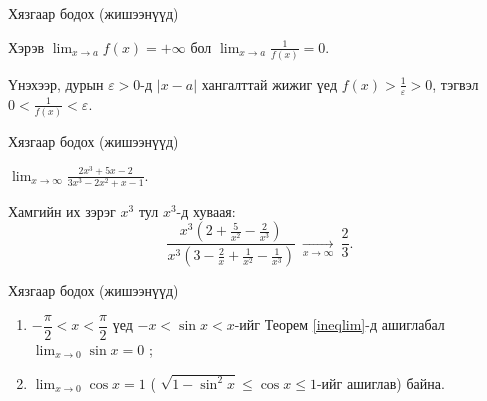 \begin{frame}[allowframebreaks]{Хязгаар бодох (жишээнүүд)}
\begin{example}\label{ininf}
Хэрэв $\displaystyle \lim_{x\to a} f(x)=+\infty$ бол $\displaystyle \lim_{x\to a}\frac{1}{f(x)}=0$.

Үнэхээр, дурын $\varepsilon>0$-д $|x-a|$ хангалттай жижиг үед $f(x)>\frac{1}{\varepsilon}>0$, тэгвэл $0<\frac{1}{f(x)}<\varepsilon$.
\end{example}
\end{frame}

\begin{frame}[allowframebreaks]{Хязгаар бодох (жишээнүүд)}
\begin{example}
$\displaystyle \lim_{x\to \infty}\frac{2x^3+5x-2}{3x^3-2x^2+x-1}$.

Хамгийн их зэрэг $x^3$ тул $x^3$-д хуваая:
\[
\frac{x^3(2+\frac{5}{x^2}-\frac{2}{x^3})}{x^3(3-\frac{2}{x}+\frac{1}{x^2}-\frac{1}{x^3})}
\ \xrightarrow[x\to\infty]{}\ \frac{2}{3}.
\]
\end{example}
\end{frame}

\begin{frame}[allowframebreaks]{Хязгаар бодох (жишээнүүд)}
\begin{example}

\begin{enumerate}[label=(\alph*)]
\item $-\dfrac{\pi}{2}<x<\dfrac{\pi}{2}$ үед $-x<\sin x<x$-ийг Теорем \ref{ineqlim}-д ашиглабал $\displaystyle \lim_{x\to 0}\sin x=0$ ;
\item $\displaystyle \lim_{x\to 0}\cos x=1$ ( $\sqrt{1-\sin^2x}\le \cos x\le 1$-ийг ашиглав) байна.
\end{enumerate}
\end{example}
\end{frame}

